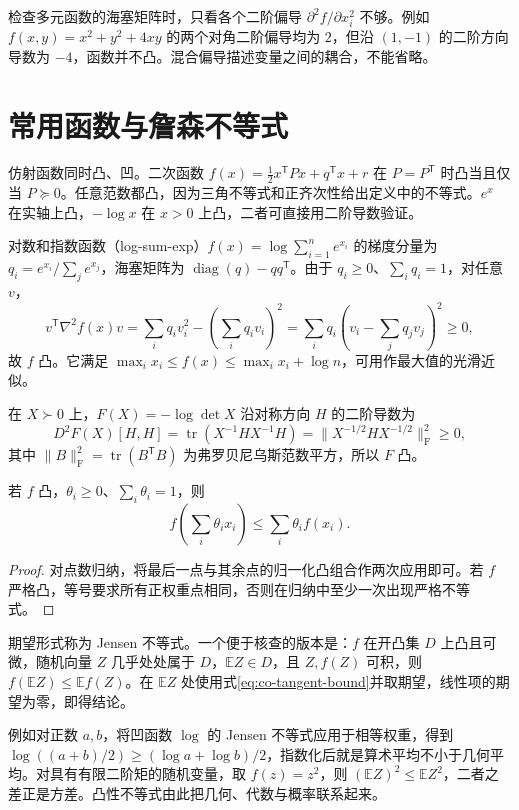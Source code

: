 检查多元函数的海塞矩阵时，只看各个二阶偏导 $\partial^2 f/\partial x_i^2$ 不够。例如 $f(x,y)=x^2+y^2+4xy$ 的两个对角二阶偏导均为 $2$，但沿 $(1,-1)$ 的二阶方向导数为 $-4$，函数并不凸。混合偏导描述变量之间的耦合，不能省略。

\section{常用函数与詹森不等式}

仿射函数同时凸、凹。二次函数 $f(x)=\tfrac12x^{\mathsf T}Px+q^{\mathsf T}x+r$ 在 $P=P^{\mathsf T}$ 时凸当且仅当 $P\succeq0$。任意范数都凸，因为三角不等式和正齐次性给出定义中的不等式。$e^x$ 在实轴上凸，$-\log x$ 在 $x>0$ 上凸，二者可直接用二阶导数验证。

对数和指数函数（log-sum-exp）$f(x)=\log\sum_{i=1}^n e^{x_i}$ 的梯度分量为 $q_i=e^{x_i}/\sum_j e^{x_j}$，海塞矩阵为 $\operatorname{diag}(q)-qq^{\mathsf T}$。由于 $q_i\geq0$、$\sum_iq_i=1$，对任意 $v$，
\[
 v^{\mathsf T}\nabla^2f(x)v
 =\sum_iq_i v_i^2-\left(\sum_iq_i v_i\right)^2
 =\sum_iq_i\left(v_i-\sum_jq_jv_j\right)^2\geq0,
\]
故 $f$ 凸。它满足 $\max_i x_i\leq f(x)\leq\max_i x_i+\log n$，可用作最大值的光滑近似。

在 $X\succ0$ 上，$F(X)=-\log\det X$ 沿对称方向 $H$ 的二阶导数为
\[
 D^2F(X)[H,H]=\operatorname{tr}(X^{-1}HX^{-1}H)
 =\|X^{-1/2}HX^{-1/2}\|_{\mathrm F}^2\geq0,
\]
其中 $\|B\|_{\mathrm F}^2=\operatorname{tr}(B^{\mathsf T}B)$ 为弗罗贝尼乌斯范数平方，所以 $F$ 凸。

\begin{proposition}[詹森不等式]
若 $f$ 凸，$\theta_i\geq0$、$\sum_i\theta_i=1$，则
\[
 f\left(\sum_i\theta_i x_i\right)\leq\sum_i\theta_i f(x_i).
\]
\end{proposition}
\begin{proof}
对点数归纳，将最后一点与其余点的归一化凸组合作两次应用即可。若 $f$ 严格凸，等号要求所有正权重点相同，否则在归纳中至少一次出现严格不等式。
\end{proof}
期望形式称为 Jensen 不等式。一个便于核查的版本是：$f$ 在开凸集 $D$ 上凸且可微，随机向量 $Z$ 几乎处处属于 $D$，$\mathbb EZ\in D$，且 $Z,f(Z)$ 可积，则 $f(\mathbb EZ)\leq\mathbb E f(Z)$。在 $\mathbb EZ$ 处使用式\eqref{eq:co-tangent-bound}并取期望，线性项的期望为零，即得结论。

例如对正数 $a,b$，将凹函数 $\log$ 的 Jensen 不等式应用于相等权重，得到 $\log((a+b)/2)\geq(\log a+\log b)/2$，指数化后就是算术平均不小于几何平均。对具有有限二阶矩的随机变量，取 $f(z)=z^2$，则 $(\mathbb EZ)^2\leq\mathbb EZ^2$，二者之差正是方差。凸性不等式由此把几何、代数与概率联系起来。

